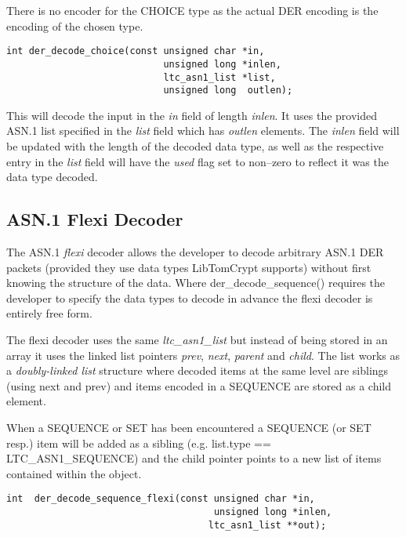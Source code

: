 \documentclass[synpaper]{book}
\begin{document}
There is no encoder for the CHOICE type as the actual DER encoding is the encoding of the chosen type.

\begin{verbatim}
int der_decode_choice(const unsigned char *in,
                            unsigned long *inlen,
                            ltc_asn1_list *list,
                            unsigned long  outlen);
\end{verbatim}

This will decode the input in the \textit{in} field of length \textit{inlen}.  It uses the provided ASN.1 list specified in the \textit{list} field which has
\textit{outlen} elements.  The \textit{inlen} field will be updated with the length of the decoded data type, as well as the respective entry in the \textit{list} field
will have the \textit{used} flag set to non--zero to reflect it was the data type decoded.

\subsection{ASN.1 Flexi Decoder}
The ASN.1 \textit{flexi} decoder allows the developer to decode arbitrary ASN.1 DER packets (provided they use data types LibTomCrypt supports) without first knowing
the structure of the data.  Where der\_decode\_sequence() requires the developer to specify the data types to decode in advance the flexi decoder is entirely
free form.

The flexi decoder uses the same \textit{ltc\_asn1\_list} but instead of being stored in an array it uses the linked list pointers \textit{prev}, \textit{next}, \textit{parent}
and \textit{child}.  The list works as a \textit{doubly-linked list} structure where decoded items at the same level are siblings (using next and prev) and items
encoded in a SEQUENCE are stored as a child element.

When a SEQUENCE or SET has been encountered a SEQUENCE (or SET resp.) item will be added as a sibling (e.g. list.type == LTC\_ASN1\_SEQUENCE) and the child
pointer points to a new list of items contained within the object.

\begin{verbatim}
int  der_decode_sequence_flexi(const unsigned char *in,
                                     unsigned long *inlen,
                                    ltc_asn1_list **out);
\end{verbatim}
\end{document}
